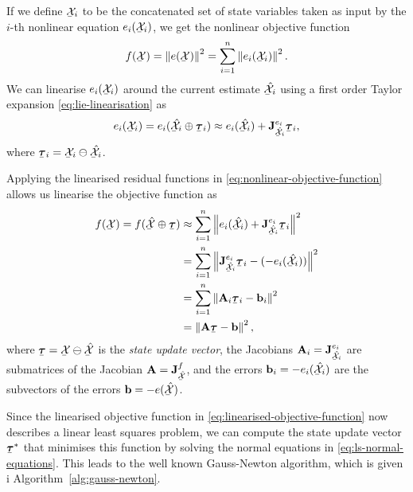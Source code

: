 If we define $\ubar{\cX}_i$ to be the concatenated set of state variables taken as input by the $i$-th nonlinear equation $e_i(\ubar{\cX}_i)$, we get the nonlinear objective function
\begin{equation} \label{eq:nonlinear-objective-function}
  f(\ubar{\cX}) = \norm{e(\ubar{\cX})}^2 = \sum^n_{i=1} \norm{e_i(\ubar{\cX}_i)}^2.
\end{equation}
We can linearise $e_i(\ubar{\cX}_i)$ around the current estimate $\ubar{\hat{\cX}}_i$ using a first order Taylor expansion \eqref{eq:lie-linearisation} as
\begin{equation}
  e_i(\ubar{\cX}_i) = e_i(\ubar{\hat{\cX}}_i \oplus \ubar{\vectau}_i) \approx e_i(\ubar{\hat{\cX}}_i) + \jac{e_i}{\ubar{\hat{\cX}}_i} \ubar{\vectau}_i,
\end{equation}
where $\ubar{\vectau}_i = \ubar{\cX}_i \ominus \ubar{\hat{\cX}}_i$.

Applying the linearised residual functions in \eqref{eq:nonlinear-objective-function} allows us linearise the objective function as
\begin{equation} \label{eq:linearised-objective-function}
\begin{split}
    f(\ubar{\cX}) = f(\ubar{\hat{\cX}} \oplus \ubar{\vectau}) &\approx \sum^n_{i=1} \norm{e_i(\ubar{\hat{\cX}}_i) + \jac{e_i}{\ubar{\hat{\cX}}_i} \ubar{\vectau}_i}^2\\
    &= \sum^n_{i=1} \norm{\jac{e_i}{\ubar{\hat{\cX}}_i} \ubar{\vectau}_i - (-e_i(\ubar{\hat{\cX}}_i))}^2\\
    &= \sum^n_{i=1} \norm{\matA_i \ubar{\vectau}_i - \vecb_i}^2\\
    &= \norm{\matA \ubar{\vectau} - \vecb}^2,
\end{split}
\end{equation}
where $\ubar{\vectau} = \ubar{\cX} \ominus \ubar{\hat{\cX}}$ is the \emph{state update vector}, the Jacobians $\matA_i = \jac{e_i}{\ubar{\hat{\cX}}_i}$ are submatrices of the Jacobian $\matA = \jac{f}{\ubar{\hat{\cX}}}$, and the errors $\vecb_i = -e_i(\ubar{\hat{\cX}}_i)$ are the subvectors of the errors $\vecb = -e(\ubar{\hat{\cX}})$.

Since the linearised objective function in \eqref{eq:linearised-objective-function} now describes a linear least squares problem, we can compute the state update vector $\ubar{\vectau}^\ast$ that minimises this function by solving the normal equations in \eqref{eq:ls-normal-equations}.
This leads to the well known Gauss-Newton algorithm, which is given i Algorithm~\ref{alg:gauss-newton}.

